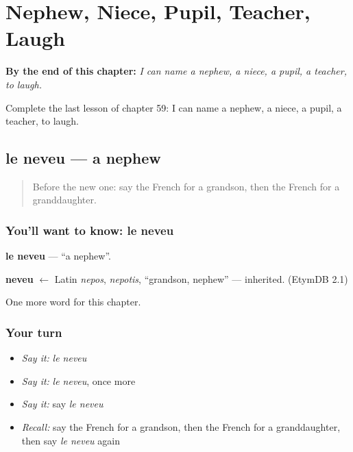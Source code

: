 
\chapter{Nephew, Niece, Pupil, Teacher, Laugh}
\label{ch:fr-nephew-niece-pupil-teacher-laugh}

\begin{chapteropening}
\textbf{By the end of this chapter:} \emph{I can name a nephew, a niece, a pupil, a teacher, to laugh.}

Complete the last lesson of chapter 59: I can name a nephew, a niece, a pupil, a teacher, to laugh.
\end{chapteropening}

\section[le neveu]{le neveu — a nephew}

\label{lesson:FR-C59-neveu}



\begin{quote}
Before the new one: say the French for a grandson, then the French for a granddaughter.
\end{quote}

\subsection*{You'll want to know: le neveu}
\textbf{le neveu} — \textquotedblleft{}a nephew\textquotedblright{}.

\begin{cousinweb}
\textbf{neveu} $\leftarrow$ Latin \emph{nepos}, \emph{nepotis}, \textquotedblleft{}grandson, nephew\textquotedblright{} — inherited. (EtymDB 2.1)
\end{cousinweb}

\begin{grammarlens}[title={What you've built}]
One more word for this chapter.
\end{grammarlens}

\subsection*{Your turn}
\begin{itemize}
\raggedright
  \item \emph{Say it:} \emph{le neveu}
  \item \emph{Say it:} \emph{le neveu}, once more
  \item \emph{Say it:} say \emph{le neveu}
  \item \emph{Recall:} say the French for a grandson, then the French for a granddaughter, then say \emph{le neveu} again
\end{itemize}

